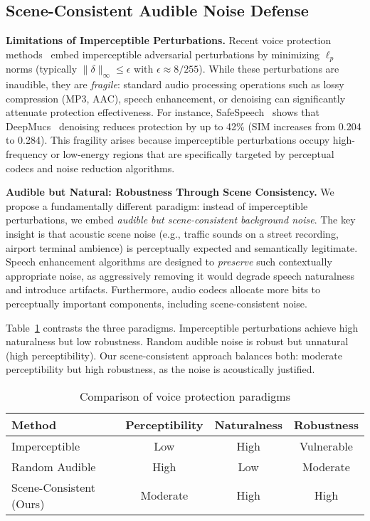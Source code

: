 \subsection{Scene-Consistent Audible Noise Defense}

\textbf{Limitations of Imperceptible Perturbations.}
Recent voice protection methods~\citep{safespeech,voiceblock} embed imperceptible adversarial perturbations by minimizing $\ell_p$ norms (typically $\|\delta\|_\infty \leq \epsilon$ with $\epsilon \approx 8/255$). While these perturbations are inaudible, they are \textit{fragile}: standard audio processing operations such as lossy compression (MP3, AAC), speech enhancement, or denoising can significantly attenuate protection effectiveness. For instance, SafeSpeech~\citep{safespeech} shows that DeepMucs~\citep{demucs} denoising reduces protection by up to 42\% (SIM increases from 0.204 to 0.284). This fragility arises because imperceptible perturbations occupy high-frequency or low-energy regions that are specifically targeted by perceptual codecs and noise reduction algorithms.

\textbf{Audible but Natural: Robustness Through Scene Consistency.}
We propose a fundamentally different paradigm: instead of imperceptible perturbations, we embed \textit{audible but scene-consistent background noise}. The key insight is that acoustic scene noise (e.g., traffic sounds on a street recording, airport terminal ambience) is perceptually expected and semantically legitimate. Speech enhancement algorithms are designed to \textit{preserve} such contextually appropriate noise, as aggressively removing it would degrade speech naturalness and introduce artifacts. Furthermore, audio codecs allocate more bits to perceptually important components, including scene-consistent noise.

Table~\ref{tab:paradigm_comparison} contrasts the three paradigms. Imperceptible perturbations achieve high naturalness but low robustness. Random audible noise is robust but unnatural (high perceptibility). Our scene-consistent approach balances both: moderate perceptibility but high robustness, as the noise is acoustically justified.

\begin{table}[t]
\centering
\caption{Comparison of voice protection paradigms}
\label{tab:paradigm_comparison}
\begin{tabular}{lccc}
\toprule
\textbf{Method} & \textbf{Perceptibility} & \textbf{Naturalness} & \textbf{Robustness} \\
\midrule
Imperceptible~\citep{safespeech} & Low & High & Vulnerable \\
Random Audible & High & Low & Moderate \\
Scene-Consistent (Ours) & Moderate & High & High \\
\bottomrule
\end{tabular}
\end{table}

